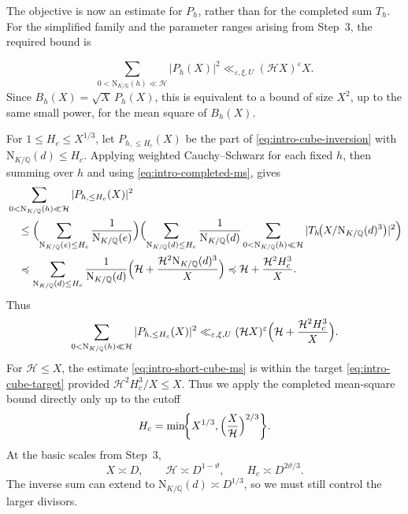 \documentclass[11pt,a4paper]{article}
\numberwithin{equation}{section}
\numberwithin{figure}{section}
\theoremstyle{definition}
\theoremstyle{remark}
\newcommand{\Q}{\mathbb Q}
\newcommand{\NK}{\mathrm N_{K/\Q}}
\newcommand{\precbd}{\preccurlyeq}
\begin{document}
The objective is now an estimate for $P_h$, rather than for the
completed sum $T_h$. For the simplified family and the parameter
ranges arising from Step~3, the required bound is

\begin{equation}\label{eq:intro-cube-target}
 \sum_{0<\NK(h)\ll\mathcal H}|P_h(X)|^2
       \ll_{\varepsilon,\xi,U}(\mathcal H X)^\varepsilon X.
\end{equation}
Since $B_h(X)=\sqrt X\,P_h(X)$, this is equivalent to a bound of size $X^2$, up to the same small power, for the mean square of $B_h(X)$.

For $1\le H_c\le X^{1/3}$, let $P_{h,\le H_c}(X)$ be the part of
\eqref{eq:intro-cube-inversion} with $\NK(d)\le H_c$.
Applying weighted Cauchy--Schwarz for each fixed $h$, then summing over $h$
and using \eqref{eq:intro-completed-ms}, gives
\[
 \begin{aligned}
 &\sum_{0<\NK(h)\ll\mathcal H}|P_{h,\le H_c}(X)|^2\\
 &\quad\le\Bigl(\sum_{\NK(e)\le H_c}\frac1{\NK(e)}\Bigr)
       \Bigl(\sum_{\NK(d)\le H_c}\frac1{\NK(d)}
       \sum_{0<\NK(h)\ll\mathcal H}
       |T_h\!\bigl(X/\NK(d)^3\bigr)|^2\Bigr)\\
 &\quad\precbd\sum_{\NK(d)\le H_c}\frac1{\NK(d)}
       \Bigl(\mathcal H+\frac{\mathcal H^2\NK(d)^3}{X}\Bigr)
       \precbd\mathcal H+\frac{\mathcal H^2H_c^3}{X}.
 \end{aligned}
\]
Thus
\begin{equation}\label{eq:intro-short-cube-ms}
 \sum_{0<\NK(h)\ll\mathcal H}|P_{h,\le H_c}(X)|^2
 \ll_{\varepsilon,\xi,U}(\mathcal H X)^\varepsilon
       \Bigl(\mathcal H+\frac{\mathcal H^2H_c^3}{X}\Bigr).
\end{equation}
For $\mathcal H\le X$, the estimate \eqref{eq:intro-short-cube-ms} is within the target \eqref{eq:intro-cube-target} provided $\mathcal H^2H_c^3/X\le X$. Thus we apply the completed mean-square bound directly only up to the cutoff
\begin{equation}\label{eq:intro-cube-cutoff}
 H_c=\min\!\biggl\{X^{1/3},
                \Bigl(\frac{X}{\mathcal H}\Bigr)^{2/3}\biggr\}.
\end{equation}
At the basic scales from Step~3,
\[
 X\asymp D,\qquad \mathcal H\asymp D^{1-\vartheta},
 \qquad H_c\asymp D^{2\vartheta/3}.
\]
The inverse sum can extend to $\NK(d)\asymp D^{1/3}$, so we must
still control the larger divisors.
\end{document}
